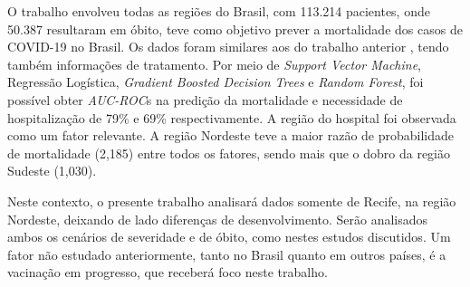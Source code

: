 O trabalho \cite{betech} envolveu todas as regiões do Brasil, com 113.214 pacientes, onde 50.387 resultaram em óbito, teve como objetivo prever a mortalidade dos casos de COVID-19 no Brasil. Os dados foram similares aos do trabalho anterior \cite{igor}, tendo também informações de tratamento. Por meio de \textit{Support Vector Machine}, Regressão Logística, \textit{Gradient Boosted Decision Trees} e \textit{Random Forest}, foi possível obter \textit{AUC-ROC}s na predição da mortalidade e necessidade de hospitalização de 79\% e 69\% respectivamente. A região do hospital foi observada como um fator relevante. A região Nordeste teve a maior razão de probabilidade de mortalidade (2,185) entre todos os fatores, sendo mais que o dobro da região Sudeste (1,030).

Neste contexto, o presente trabalho analisará dados somente de Recife, na região Nordeste, deixando de lado diferenças de desenvolvimento. Serão analisados ambos os cenários de severidade e de óbito, como nestes estudos discutidos. Um fator não estudado anteriormente, tanto no Brasil quanto em outros países, é a vacinação em progresso, que receberá foco neste trabalho.